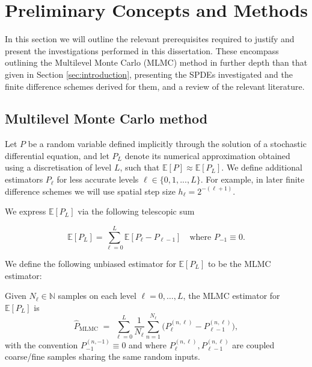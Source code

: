 \section{Preliminary Concepts and Methods}

In this section we will outline the relevant prerequisites required to 
justify and present the investigations performed in this dissertation. 
These encompass outlining the Multilevel Monte Carlo (MLMC)
method in further depth than that given in Section \ref{sec:introduction}, 
presenting the SPDEs investigated and the finite difference schemes derived for them,
and a review of the relevant literature.
\cite{giles2015multilevel}

\subsection{Multilevel Monte Carlo method}

Let $P$ be a random variable defined implicitly through the solution of a stochastic
differential equation, and let $P_L$ denote its numerical approximation 
obtained using a discretisation of level $L$, such that 
$\mathbb{E}[P] \approx \mathbb{E}[P_L]$. We define additional estimators $P_\ell$ 
for less accurate levels $\ell \in \{0, 1, ..., L\}$.
For example, in later  
finite difference schemes we will use spatial step size $h_\ell = 2^{-(\ell+1)}$.

We express $\mathbb{E}[P_L]$ via the following telescopic sum

\begin{equation*}
    \mathbb{E}[P_L] = \sum_{\ell = 0}^L \mathbb{E}\left[P_\ell - P_{\ell - 1}\right] 
    \quad \text{where } P_{-1} \equiv 0.
\end{equation*}

We define the following unbiased estimator for $\mathbb{E}[P_L]$ to be the MLMC estimator:

\begin{definition}\label{def:mlmc_estimator}
    Given $N_\ell \in \mathbb{N}$ samples on each level $\ell = 0, \dots, L$, the 
    MLMC estimator for $\mathbb{E}[P_L]$ is
    \[
    \hat{P}_{\mathrm{MLMC}} 
    \;=\; \sum_{\ell=0}^L 
    \frac{1}{N_\ell} \sum_{n=1}^{N_\ell}
    \big( P_\ell^{(n,\ell)} - P_{\ell-1}^{(n,\ell)} \big),
    \]
    with the convention $P_{-1}^{(n, -1)} \equiv 0$ and where $P_\ell^{(n, \ell)},
    P_{\ell - 1}^{(n, \ell)}$ are coupled coarse/fine samples sharing the same random inputs.
\end{definition}

